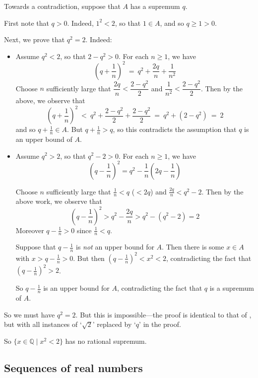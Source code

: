 \begin{cproof}
Towards a contradiction, suppose that $A$ has a supremum $q$.

First note that $q>0$. Indeed, $1^2 < 2$, so that $1 \in A$, and so $q \ge 1 > 0$.

Next, we prove that $q^2 = 2$. Indeed:
\begin{itemize}
\item Assume $q^2 < 2$, so that $2-q^2 > 0$. For each $n \ge 1$, we have
\[ \left( q + \frac{1}{n} \right)^2 ~=~ q^2 + \frac{2q}{n} + \frac{1}{n^2} \]
Choose $n$ sufficiently large that $\dfrac{2q}{n} < \dfrac{2-q^2}{2}$ and $\dfrac{1}{n^2} < \dfrac{2-q^2}{2}$. Then by the above, we observe that
\[ \left( q + \frac{1}{n} \right)^2 ~<~ q^2 + \dfrac{2-q^2}{2} + \dfrac{2-q^2}{2} ~=~ q^2 + (2-q^2) ~=~ 2 \]
and so $q+\frac{1}{n} \in A$. But $q + \frac{1}{n} > q$, so this contradicts the assumption that $q$ is an upper bound of $A$.

\item Assume $q^2 > 2$, so that $q^2-2 > 0$. For each $n \ge 1$, we have
\[ \left( q - \frac{1}{n} \right)^2 = q^2 - \frac{1}{n} \left( 2q - \frac{1}{n} \right) \]

Choose $n$ sufficiently large that $\frac{1}{n} < q$ ($< 2q$) and $\frac{2q}{n} < q^2-2$. Then by the above work, we observe that
\[ \left( q - \frac{1}{n} \right)^2 > q^2 - \frac{2q}{n} > q^2 - (q^2-2) = 2 \]
Moreover $q-\frac{1}{n} > 0$ since $\frac{1}{n} < q$.

Suppose that $q-\frac{1}{n}$ is \textit{not} an upper bound for $A$. Then there is some $x \in A$ with $x > q-\frac{1}{n} > 0$. But then $(q-\frac{1}{n})^2 < x^2 < 2$, contradicting the fact that $\left( q-\frac{1}{n} \right)^2 > 2$.

So $q-\frac{1}{n}$ is an upper bound for $A$, contradicting the fact that $q$ is a supremum of $A$.
\end{itemize}

So we must have $q^2 = 2$. But this is impossible---the proof is identical to that of , but with all instances of `$\sqrt{2}$' replaced by `$q$' in the proof.

So $\{ x \in \mathbb{Q} \mid x^2 < 2 \}$ has no rational supremum.
\end{cproof}

\subsection*{Sequences of real numbers}

